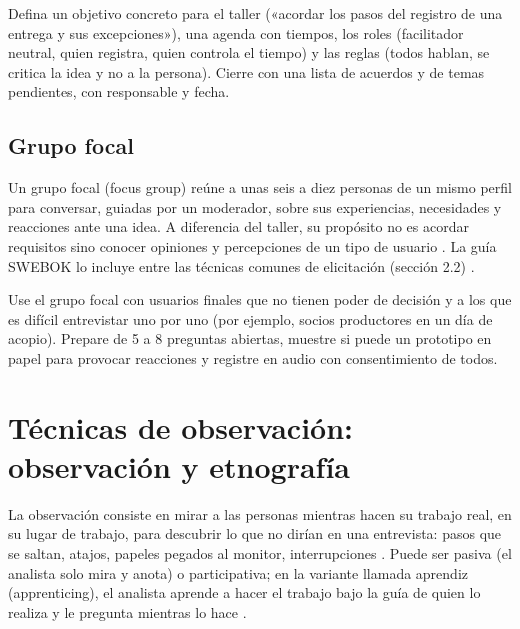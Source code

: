 \documentclass[11pt,a4paper,oneside]{report}
\begin{document}
\begin{enlapractica}
	Defina un objetivo concreto para el taller («acordar los pasos del registro de una entrega y sus excepciones»), una agenda con tiempos, los roles (facilitador neutral, quien registra, quien controla el tiempo) y las reglas (todos hablan, se critica la idea y no a la persona). Cierre con una lista de acuerdos y de temas pendientes, con responsable y fecha.
\end{enlapractica}

\subsection{Grupo focal}

Un grupo focal (focus group) reúne a unas seis a diez personas de un mismo perfil para conversar, guiadas por un moderador, sobre sus experiencias, necesidades y reacciones ante una idea. A diferencia del taller, su propósito no es acordar requisitos sino conocer opiniones y percepciones de un tipo de usuario \citep{zowghi_coulin_2005}. La guía SWEBOK lo incluye entre las técnicas comunes de elicitación (sección 2.2) \citep{swebok_v4_2024}.

\begin{enlapractica}
	Use el grupo focal con usuarios finales que no tienen poder de decisión y a los que es difícil entrevistar uno por uno (por ejemplo, socios productores en un día de acopio). Prepare de 5 a 8 preguntas abiertas, muestre si puede un prototipo en papel para provocar reacciones y registre en audio con consentimiento de todos.
\end{enlapractica}

\section{Técnicas de observación: observación y etnografía}

La observación consiste en mirar a las personas mientras hacen su trabajo real, en su lugar de trabajo, para descubrir lo que no dirían en una entrevista: pasos que se saltan, atajos, papeles pegados al monitor, interrupciones \citep{zowghi_coulin_2005,robertson_2025}. Puede ser pasiva (el analista solo mira y anota) o participativa; en la variante llamada aprendiz (apprenticing), el analista aprende a hacer el trabajo bajo la guía de quien lo realiza y le pregunta mientras lo hace \citep{robertson_2025}.
\end{document}
